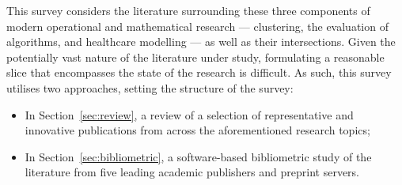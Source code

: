 This survey considers the literature surrounding these three components of
modern operational and mathematical research --- clustering, the evaluation of
algorithms, and healthcare modelling --- as well as their intersections. Given
the potentially vast nature of the literature under study, formulating a
reasonable slice that encompasses the state of the research is difficult. As
such, this survey utilises two approaches, setting the structure of the survey:

\begin{itemize}
    \item In Section~\ref{sec:review}, a review of a selection of representative
        and innovative publications from across the aforementioned research
        topics;
    \item In Section~\ref{sec:bibliometric}, a software-based bibliometric study
        of the literature from five leading academic publishers and preprint
        servers.
\end{itemize}
